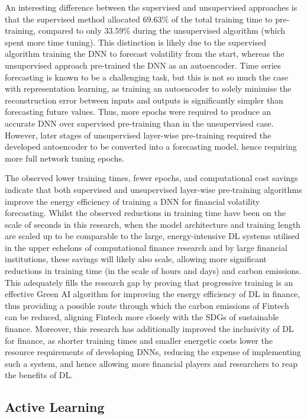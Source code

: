 \documentclass[a4paper, 11pt]{report}
\begin{document}
    An interesting difference between the supervised and unsupervised approaches is that the supervised method allocated $69.63\%$ of the total training time to pre-training, compared to only $33.59\%$ during the unsupervised algorithm (which spent more time tuning). This distinction is likely due to the supervised algorithm training the DNN to forecast volatility from the start, whereas the unsupervised approach pre-trained the DNN as an autoencoder. Time series forecasting is known to be a challenging task, but this is not so much the case with representation learning, as training an autoencoder to solely minimise the reconstruction error between inputs and outputs is significantly simpler than forecasting future values. Thus, more epochs were required to produce an accurate DNN over supervised pre-training than in the unsupervised case. However, later stages of unsupervised layer-wise pre-training required the developed autoencoder to be converted into a forecasting model, hence requiring more full network tuning epochs.

    The observed lower training times, fewer epochs, and computational cost savings indicate that both supervised and unsupervised layer-wise pre-training algorithms improve the energy efficiency of training a DNN for financial volatility forecasting. Whilst the observed reductions in training time have been on the scale of seconds in this research, when the model architecture and training length are scaled up to be comparable to the large, energy-intensive DL systems utilised in the upper echelons of computational finance research and by large financial institutions, these savings will likely also scale, allowing more significant reductions in training time (in the scale of hours and days) and carbon emissions. This adequately fills the research gap by proving that progressive training is an effective Green AI algorithm for improving the energy efficiency of DL in finance, thus providing a possible route through which the carbon emissions of Fintech can be reduced, aligning Fintech more closely with the SDGs of sustainable finance. Moreover, this research has additionally improved the inclusivity of DL for finance, as shorter training times and smaller energetic costs lower the resource requirements of developing DNNs, reducing the expense of implementing such a system, and hence allowing more financial players and researchers to reap the benefits of DL.


    \subsection{Active Learning}
\end{document}

